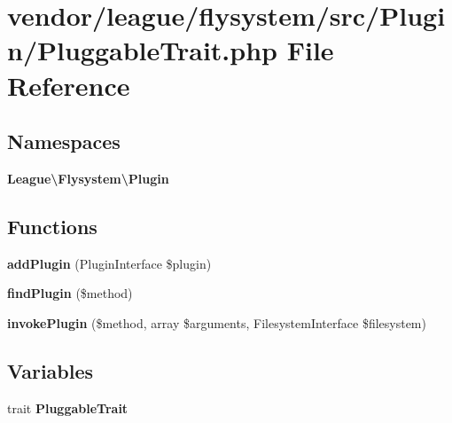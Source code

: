 \section{vendor/league/flysystem/src/\+Plugin/\+Pluggable\+Trait.php File Reference}
\label{_pluggable_trait_8php}
\subsection*{Namespaces}
\begin{DoxyCompactItemize}
\item 
 {\bf League\textbackslash{}\+Flysystem\textbackslash{}\+Plugin}
\end{DoxyCompactItemize}
\subsection*{Functions}
\begin{DoxyCompactItemize}
\item 
{\bf add\+Plugin} (Plugin\+Interface \$plugin)
\item 
{\bf find\+Plugin} (\$method)
\item 
{\bf invoke\+Plugin} (\$method, array \$arguments, Filesystem\+Interface \$filesystem)
\end{DoxyCompactItemize}
\subsection*{Variables}
\begin{DoxyCompactItemize}
\item 
trait {\bf Pluggable\+Trait}
\end{DoxyCompactItemize}
